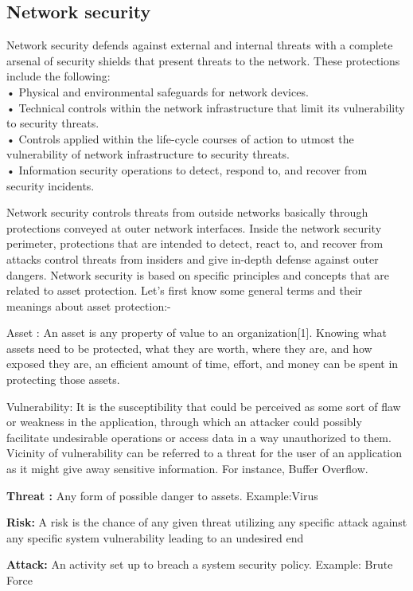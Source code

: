 \documentclass[conference]{IEEEtran}
\begin{document}
\subsection{Network security}
Network security defends against external and internal threats with a complete arsenal of security shields that present threats to the network. These protections include the following:
\\• Physical and environmental safeguards for network devices.
\\• Technical controls within the network infrastructure that limit its vulnerability to security threats.
\\• Controls applied within the life-cycle courses of action to utmost the vulnerability of network infrastructure to security threats.
\\• Information security operations to detect, respond to, and recover from security incidents.

Network security controls threats from outside networks basically through protections conveyed at outer network interfaces. Inside the network security perimeter, protections that are intended to detect, react to, and recover from attacks control threats from insiders and give in-depth defense against outer dangers. Network security is based on specific principles and concepts that are related to asset
protection. Let's first know some general terms and their meanings about asset protection:-

Asset : An asset is any property of value to an organization[1]. Knowing what assets need to be protected, what they are worth, where they are, and how exposed they are, an efficient amount of time, effort, and money can be spent in protecting those assets.

Vulnerability: It is the susceptibility that could be perceived as some sort of flaw or weakness in the application, through which an attacker could possibly facilitate undesirable operations or access data in a way unauthorized to them. Vicinity of vulnerability can be referred to a threat for the user of an application as it might give away sensitive information. For instance, Buffer Overflow.

\textbf{Threat :} Any form of possible danger to assets. Example:Virus

\textbf{Risk:} A risk is the chance of any given threat utilizing any specific attack against any specific system vulnerability leading to an undesired end

\textbf{Attack: } An activity set up to breach a system security policy. Example: Brute Force
\end{document}
